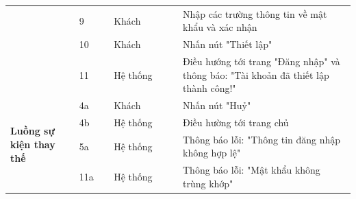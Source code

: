 \documentclass[../DoAn.tex]{subfiles}
\begin{document}
\begin{table}[ht]
\begin{tabular}{| p{0.2\linewidth} | p{0.1\linewidth} | p{0.2\linewidth} | p{0.5\linewidth} |}
                                                                     & \multicolumn{1}{p{0.1\linewidth}|}{9}                                                  & \multicolumn{1}{p{0.2\linewidth}|}{Khách}                  & \multicolumn{1}{p{0.5\linewidth}|}{Nhập các trường thông tin về mật khẩu và xác nhận}                                   \\ \cline{2-4}
                                                                     & \multicolumn{1}{p{0.1\linewidth}|}{10}                                                 & \multicolumn{1}{p{0.2\linewidth}|}{Khách}                  & \multicolumn{1}{p{0.5\linewidth}|}{Nhấn nút "Thiết lập"}                                                                \\ \cline{2-4}
                                                                     & \multicolumn{1}{p{0.1\linewidth}|}{11}                                                 & \multicolumn{1}{p{0.2\linewidth}|}{Hệ thống}               & \multicolumn{1}{p{0.5\linewidth}|}{Điều hướng tới trang "Đăng nhập" và thông báo: "Tài khoản đã thiết lập thành công!"} \\ \hline
        \multirow{4}{\linewidth}{\textbf{Luồng sự kiện thay thế}}    & \multicolumn{1}{p{0.1\linewidth}|}{4a}                                                 & \multicolumn{1}{p{0.2\linewidth}|}{Khách}                  & \multicolumn{1}{p{0.5\linewidth}|}{Nhấn nút "Huỷ"}                                                                      \\ \cline{2-4}
                                                                     & \multicolumn{1}{p{0.1\linewidth}|}{4b}                                                 & \multicolumn{1}{p{0.2\linewidth}|}{Hệ thống}               & \multicolumn{1}{p{0.5\linewidth}|}{Điều hường tới trang chủ}                                                            \\ \cline{2-4}
                                                                     & \multicolumn{1}{p{0.1\linewidth}|}{5a}                                                 & \multicolumn{1}{p{0.2\linewidth}|}{Hệ thống}               & \multicolumn{1}{p{0.5\linewidth}|}{Thông báo lỗi: "Thông tin đăng nhập không hợp lệ"}                                   \\ \cline{2-4}
                                                                     & \multicolumn{1}{p{0.1\linewidth}|}{11a}                                                & \multicolumn{1}{p{0.2\linewidth}|}{Hệ thống}               & \multicolumn{1}{p{0.5\linewidth}|}{Thông báo lỗi: "Mật khẩu không trùng khớp"}                                          \\ \hline

\end{tabular}
\end{table}
\end{document}
